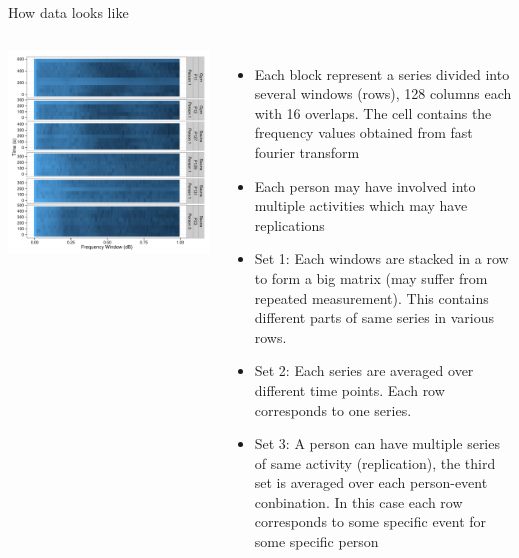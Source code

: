 \documentclass[newPxFont]{beamer}\usepackage[]{graphicx}\usepackage[]{color}
\makeatletter
\def\maxwidth{ %
  \ifdim\Gin@nat@width>\linewidth
    \linewidth
  \else
    \Gin@nat@width
  \fi
}
\newenvironment{knitrout}{}{} %
\makeatother
\begin{document}
\begin{frame}[t]{How data looks like}
\begin{columns}[t]
\begin{knitrout}
\color{fgcolor}
\includegraphics[width=\maxwidth]{figure/dataVizPrint-1} 

\end{knitrout}
\begin{itemize}[<only@+>]
\item Each block represent a series divided into several windows (rows), 128 columns each with 16 overlaps. The cell contains the frequency values obtained from fast fourier transform
\item Each person may have involved into multiple activities which may have replications
\item Set 1: Each windows are stacked in a row to form a big matrix (may suffer from repeated measurement). This contains different parts of same series in various rows.
\item Set 2: Each series are averaged over different time points. Each row corresponds to one series.
\item Set 3: A person can have multiple series of same activity (replication), the third set is averaged over each person-event conbination. In this case each row corresponds to some specific event for some specific person
\end{itemize}
\end{columns}
\end{frame}
\end{document}
